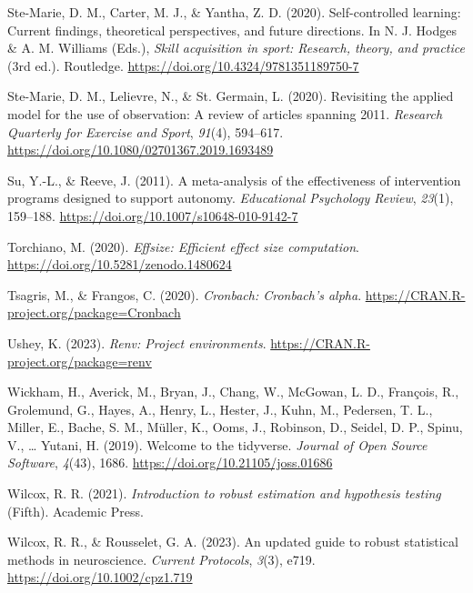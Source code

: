 \documentclass[
  doc, donotrepeattitle,floatsintext]{apa7}
\newlength{\cslhangindent}
\newlength{\cslentryspacingunit} %
\newenvironment{CSLReferences}[2] %
 {%
  \setlength{\parindent}{0pt}
  \ifodd #1
  \let\oldpar\par
  \def\par{\hangindent=\cslhangindent\oldpar}
  \fi
  \setlength{\parskip}{#2\cslentryspacingunit}
 }%
 {}
\begin{document}
\begin{CSLReferences}{1}{0}
\leavevmode{}%
Ste-Marie, D. M., Carter, M. J., \& Yantha, Z. D. (2020). Self-controlled learning: {Current} findings, theoretical perspectives, and future directions. In N. J. Hodges \& A. M. Williams (Eds.), \emph{Skill acquisition in sport: {Research}, theory, and practice} (3rd ed.). Routledge. \url{https://doi.org/10.4324/9781351189750-7}

\leavevmode{}%
Ste-Marie, D. M., Lelievre, N., \& St. Germain, L. (2020). Revisiting the applied model for the use of observation: {A} review of articles spanning 2011. \emph{Research Quarterly for Exercise and Sport}, \emph{91}(4), 594--617. \url{https://doi.org/10.1080/02701367.2019.1693489}

\leavevmode{}%
Su, Y.-L., \& Reeve, J. (2011). A meta-analysis of the effectiveness of intervention programs designed to support autonomy. \emph{Educational Psychology Review}, \emph{23}(1), 159--188. \url{https://doi.org/10.1007/s10648-010-9142-7}

\leavevmode{}%
Torchiano, M. (2020). \emph{Effsize: Efficient effect size computation}. \url{https://doi.org/10.5281/zenodo.1480624}

\leavevmode{}%
Tsagris, M., \& Frangos, C. (2020). \emph{Cronbach: Cronbach's alpha}. \url{https://CRAN.R-project.org/package=Cronbach}

\leavevmode{}%
Ushey, K. (2023). \emph{Renv: Project environments}. \url{https://CRAN.R-project.org/package=renv}

\leavevmode{}%
Wickham, H., Averick, M., Bryan, J., Chang, W., McGowan, L. D., François, R., Grolemund, G., Hayes, A., Henry, L., Hester, J., Kuhn, M., Pedersen, T. L., Miller, E., Bache, S. M., Müller, K., Ooms, J., Robinson, D., Seidel, D. P., Spinu, V., \ldots{} Yutani, H. (2019). Welcome to the {tidyverse}. \emph{Journal of Open Source Software}, \emph{4}(43), 1686. \url{https://doi.org/10.21105/joss.01686}

\leavevmode{}%
Wilcox, R. R. (2021). \emph{Introduction to robust estimation and hypothesis testing} (Fifth). {Academic Press}.

\leavevmode{}%
Wilcox, R. R., \& Rousselet, G. A. (2023). An updated guide to robust statistical methods in neuroscience. \emph{Current Protocols}, \emph{3}(3), e719. \url{https://doi.org/10.1002/cpz1.719}


\end{CSLReferences}
\end{document}
